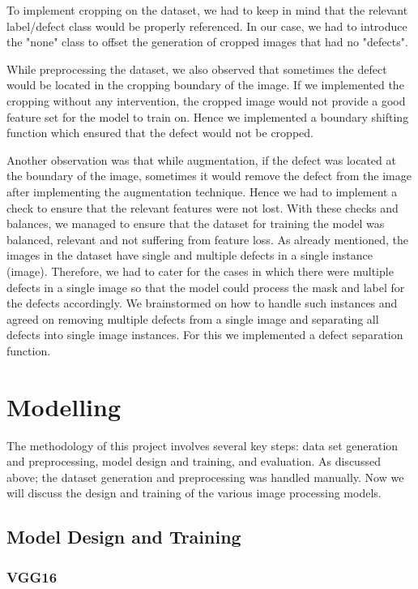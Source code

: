 \documentclass[12pt]{article}
\begin{document}
To implement cropping on the dataset, we had to keep in mind that the relevant label/defect class would be properly referenced. In our case, we had to introduce the "none" class to offset the generation of cropped images that had no "defects".

While preprocessing the dataset, we also observed that sometimes the defect would be located in the cropping boundary of the image. If we implemented the cropping without any intervention, the cropped image would not provide a good feature set for the model to train on. Hence we implemented a boundary shifting function which ensured that the defect would not be cropped.

Another observation was that while augmentation, if the defect was located at the boundary of the image, sometimes it would remove the defect from the image after implementing the augmentation
technique. Hence we had to implement a check to ensure that the relevant features were not lost. With these checks and balances, we managed to ensure that the dataset for training the model was balanced, relevant and not suffering from feature loss.
As already mentioned, the images in the dataset have single and multiple defects in a single instance (image). Therefore, we had to cater for the cases in which there were multiple defects in a single image so that the model could process the mask and label for the defects accordingly. We brainstormed on how to handle such instances and agreed on removing multiple defects from a single image and separating all defects into single image instances. For this we implemented a defect separation function.

\clearpage
\newpage

\section{Modelling}
The methodology of this project involves several key steps: data set generation and preprocessing, model design and training, and evaluation. As discussed above; the dataset generation and preprocessing was handled manually. Now we will discuss the design and training of the various image processing models.

\subsection{Model Design and Training}

\subsubsection{VGG16}
\end{document}
